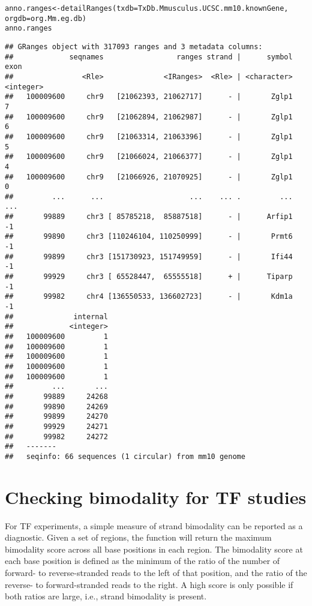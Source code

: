 \documentclass{report}\usepackage[]{graphicx}\usepackage[usenames,dvipsnames]{color}
\newcommand{\hlstd}[1]{\textcolor[rgb]{0.251,0.251,0.251}{#1}}%
\newcommand{\hlkwb}[1]{\textcolor[rgb]{0,0,0}{#1}}%
\newcommand{\hlkwc}[1]{\textcolor[rgb]{0.251,0.251,0.251}{#1}}%
\newcommand{\hlkwd}[1]{\textcolor[rgb]{0.878,0.439,0.125}{#1}}%
\newenvironment{knitrout}{}{} %
\begin{document}
\begin{knitrout}
\color{fgcolor}\begin{kframe}
\begin{alltt}
\hlstd{anno.ranges} \hlkwb{<-} \hlkwd{detailRanges}\hlstd{(}\hlkwc{txdb}\hlstd{=TxDb.Mmusculus.UCSC.mm10.knownGene,}
                            \hlkwc{orgdb}\hlstd{=org.Mm.eg.db)}
\hlstd{anno.ranges}
\end{alltt}
\begin{verbatim}
## GRanges object with 317093 ranges and 3 metadata columns:
##             seqnames                 ranges strand |      symbol      exon
##                <Rle>              <IRanges>  <Rle> | <character> <integer>
##   100009600     chr9   [21062393, 21062717]      - |       Zglp1         7
##   100009600     chr9   [21062894, 21062987]      - |       Zglp1         6
##   100009600     chr9   [21063314, 21063396]      - |       Zglp1         5
##   100009600     chr9   [21066024, 21066377]      - |       Zglp1         4
##   100009600     chr9   [21066926, 21070925]      - |       Zglp1         0
##         ...      ...                    ...    ... .         ...       ...
##       99889     chr3 [ 85785218,  85887518]      - |      Arfip1        -1
##       99890     chr3 [110246104, 110250999]      - |       Prmt6        -1
##       99899     chr3 [151730923, 151749959]      - |       Ifi44        -1
##       99929     chr3 [ 65528447,  65555518]      + |      Tiparp        -1
##       99982     chr4 [136550533, 136602723]      - |       Kdm1a        -1
##              internal
##             <integer>
##   100009600         1
##   100009600         1
##   100009600         1
##   100009600         1
##   100009600         1
##         ...       ...
##       99889     24268
##       99890     24269
##       99899     24270
##       99929     24271
##       99982     24272
##   -------
##   seqinfo: 66 sequences (1 circular) from mm10 genome
\end{verbatim}
\end{kframe}
\end{knitrout}

\section{Checking bimodality for TF studies}
For TF experiments, a simple measure of strand bimodality can be reported as a diagnostic.
Given a set of regions, the  function will return the maximum bimodality score across all base positions in each region.
The bimodality score at each base position is defined as the minimum of the ratio of the number of forward- to reverse-stranded reads to the left of that position, and the ratio of the reverse- to forward-stranded reads to the right.
A high score is only possible if both ratios are large, i.e., strand bimodality is present.
\end{document}
